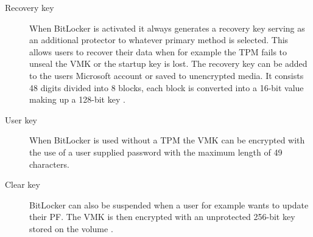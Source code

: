 \begin{description}
    \item[Recovery key]
        When BitLocker is activated it always generates a recovery key serving as an additional protector to whatever primary method is selected.
        This allows users to recover their data when for example the \ac{TPM} fails to unseal the \ac{VMK} or the startup key is lost.
        The recovery key can be added to the users Microsoft account or saved to unencrypted media.
        It consists 48 digits divided into 8 blocks, each block is converted into a 16-bit value making up a 128-bit key \cite[Section 2.4]{bde-format-spec}.

    \item[User key] When BitLocker is used without a \ac{TPM} the \ac{VMK} can be encrypted with the use of a user supplied password with the maximum length of 49 characters. \cite[Section 2.7]{bde-format-spec}

    \item[Clear key] BitLocker can also be suspended when a user for example wants to update their \ac{PF}.
        The \ac{VMK} is then encrypted with an unprotected 256-bit key stored on the volume \cite[Section 2.5]{bde-format-spec}.

\end{description}